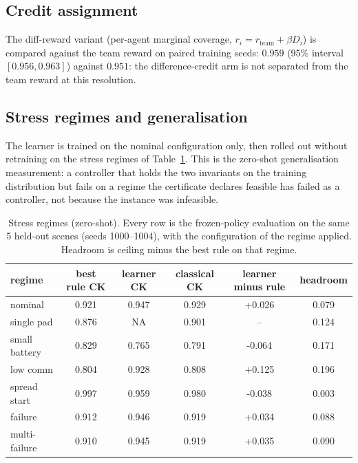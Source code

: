 \documentclass[conference]{IEEEtran}
\begin{document}
\subsection{Credit assignment}
\label{sec:results_credit}

The diff-reward variant (per-agent marginal coverage, $r_i = r_{\text{team}}
+ \beta D_i$) is compared against the team reward on paired training seeds:
$0.959$ (95\% interval $[0.956, 0.963]$) against $0.951$: the difference-credit arm is not separated from the team reward at this resolution.
\subsection{Stress regimes and generalisation}
\label{sec:results_stress}

The learner is trained on the nominal configuration only, then rolled out
without retraining on the stress regimes of Table~\ref{tab:stress}.  This is
the zero-shot generalisation measurement: a controller that holds the two
invariants on the training distribution but fails on a regime the certificate
declares feasible has failed as a controller, not because the instance was
infeasible.

\begin{table}[t]
\caption{Stress regimes (zero-shot).  Every row is the frozen-policy
evaluation on the same 5 held-out scenes (seeds 1000--1004), with the
configuration of the regime applied.  Headroom is ceiling minus the best rule on that regime.}
\label{tab:stress}
\centering
\scriptsize
\setlength{\tabcolsep}{3pt}
\begin{tabular}{@{}lccccc@{}}
\toprule
regime & best rule CK & learner CK & classical CK & learner minus rule & headroom \\
\midrule
nominal        & 0.921 & 0.947 & 0.929 & +0.026 & 0.079 \\
single pad     & 0.876 & NA & 0.901 & -- & 0.124 \\
small battery  & 0.829 & 0.765 & 0.791 & -0.064 & 0.171 \\
low comm       & 0.804 & 0.928 & 0.808 & +0.125 & 0.196 \\
spread start & 0.997 & 0.959 & 0.980 & -0.038 & 0.003 \\
failure        & 0.912 & 0.946 & 0.919 & +0.034 & 0.088 \\
multi-failure  & 0.910 & 0.945 & 0.919 & +0.035 & 0.090 \\
\bottomrule
\end{tabular}
\par\vspace{2.5pt}{\scriptsize\itshape The headroom gate of the evaluation framework requires ceiling minus
best rule $\ge 0.10$ on a regime before a learned controller on that regime is
meaningfully compared: below it, the ceiling is too close for a controller
comparison to separate anything.  Regimes whose best rule leaves less than
0.10 of headroom are reported as such rather than forced through the gate.}
\end{table}
\end{document}
